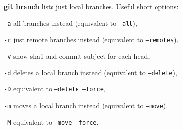 %

\textbf{git branch} lists just local branches.
Useful short options:
\begin{compactenum}
\item [\texttt{-a}] all branches instead (equivalent to \texttt{--all}),
\item [\texttt{-r}] just remote branches instead (equivalent to \texttt{--remotes}),
\item [\texttt{-v}] show sha1 and commit subject for each head,
\item [\texttt{-d}] deletes a local branch instead (equivalent to \texttt{--delete}),
\item [\texttt{-D}] equivalent to \texttt{--delete --force},
\item [\texttt{-m}] moves a local branch instead (equivalent to \texttt{--move}),
\item [\texttt{-M}] equivalent to \texttt{--move --force}.
\end{compactenum}

%